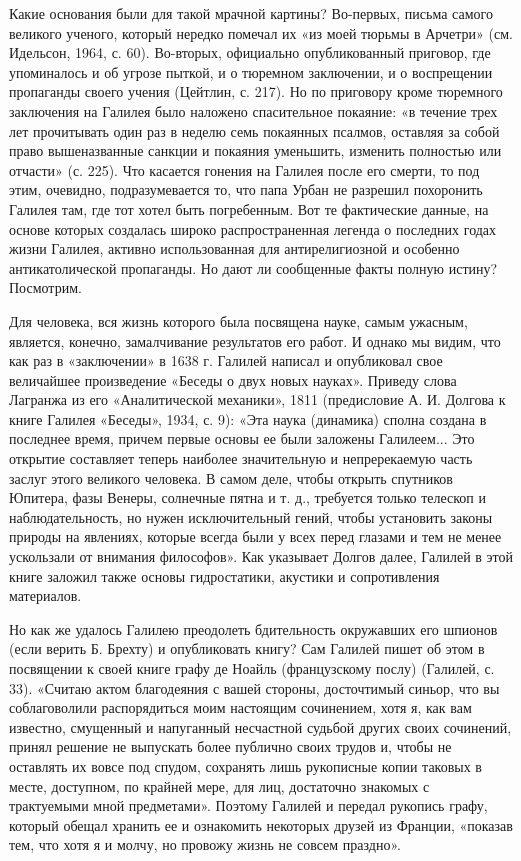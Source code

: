Какие  основания были  для  такой мрачной  картины? Во-первых,  письма
самого великого  ученого, который нередко  помечал их «из  моей тюрьмы
в  Арчетри»  (см.  Идельсон,   1964,  с.  60).  Во-вторых,  официально
опубликованный  приговор,  где  упоминалось  и  об  угрозе  пыткой,  и
о  тюремном  заключении,  и  о воспрещении  пропаганды  своего  учения
(Цейтлин,  с. 217).  Но  по приговору  кроме  тюремного заключения  на
Галилея  было  наложено спасительное  покаяние:  «в  течение трех  лет
прочитывать  один раз  в неделю  семь покаянных  псалмов, оставляя  за
собой  право  вышеназванные  санкции и  покаяния  уменьшить,  изменить
полностью  или отчасти»  (с.  225). Что  касается  гонения на  Галилея
после  его смерти,  то  под этим,  очевидно,  подразумевается то,  что
папа  Урбан не  разрешил похоронить  Галилея там,  где тот  хотел быть
погребенным. Вот  те фактические  данные, на основе  которых создалась
широко  распространенная  легенда  о последних  годах  жизни  Галилея,
активно использованная для антирелигиозной и особенно антикатолической
пропаганды. Но дают ли сообщенные факты полную истину? Посмотрим.

Для человека, вся жизнь которого  была посвящена науке, самым ужасным,
является,  конечно,  замалчивание  результатов  его  работ.  И  однако
мы  видим, что  как  раз  в «заключении»  в  1638  г. Галилей  написал
и  опубликовал  свое  величайшее  произведение «Беседы  о  двух  новых
науках». Приведу слова Лагранжа  из его «Аналитической механики», 1811
(предисловие  А. И.  Долгова к  книге Галилея  «Беседы», 1934,  с. 9):
«Эта  наука  (динамика)  сполна  создана  в  последнее  время,  причем
первые  основы ее  были заложены  Галилеем... Это  открытие составляет
теперь  наиболее  значительную  и  непререкаемую  часть  заслуг  этого
великого  человека. В  самом  деле, чтобы  открыть спутников  Юпитера,
фазы  Венеры, солнечные  пятна и  т. д.,  требуется только  телескоп и
наблюдательность,  но  нужен  исключительный гений,  чтобы  установить
законы природы на явлениях, которые всегда были у всех перед глазами и
тем не менее  ускользали от внимания философов».  Как указывает Долгов
далее,  Галилей  в  этой  книге  заложил  также  основы  гидростатики,
акустики и сопротивления материалов.

Но  как  же удалось  Галилею  преодолеть  бдительность окружавших  его
шпионов  (если верить  Б. Брехту)  и опубликовать  книгу? Сам  Галилей
пишет об этом в посвящении к своей книге графу де Ноайль (французскому
послу) (Галилей,  с. 33). «Считаю  актом благодеяния с  вашей стороны,
досточтимый синьор, что вы  соблаговолили распорядиться моим настоящим
сочинением,  хотя   я,  как  вам  известно,   смущенный  и  напуганный
несчастной судьбой других своих сочинений, принял решение не выпускать
более публично своих трудов и, чтобы не оставлять их вовсе под спудом,
сохранять лишь рукописные копии таковых в месте, доступном, по крайней
мере,  для лиц,  достаточно знакомых  с трактуемыми  мной предметами».
Поэтому Галилей и передал рукопись  графу, который обещал хранить ее и
ознакомить некоторых  друзей из  Франции, «показав тем,  что хотя  я и
молчу, но провожу жизнь не совсем праздно».

